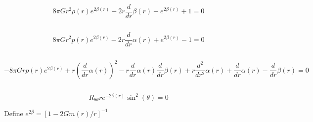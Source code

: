 \documentclass[11pt]{article}
\begin{document}
    \begin{Verbatim}[commandchars=\\\{\}]

    \end{Verbatim}

    $$8 \pi G r^{2} \rho{\left(r \right)} e^{2 \beta{\left(r \right)}} - 2 r \frac{d}{d r} \beta{\left(r \right)} - e^{2 \beta{\left(r \right)}} + 1=0$$

    
    \begin{Verbatim}[commandchars=\\\{\}]

    \end{Verbatim}

    $$8 \pi G r^{2} p{\left(r \right)} e^{2 \beta{\left(r \right)}} - 2 r \frac{d}{d r} \alpha{\left(r \right)} + e^{2 \beta{\left(r \right)}} - 1=0$$

    
    \begin{Verbatim}[commandchars=\\\{\}]

    \end{Verbatim}

    $$- 8 \pi G r p{\left(r \right)} e^{2 \beta{\left(r \right)}} + r \left(\frac{d}{d r} \alpha{\left(r \right)}\right)^{2} - r \frac{d}{d r} \alpha{\left(r \right)} \frac{d}{d r} \beta{\left(r \right)} + r \frac{d^{2}}{d r^{2}} \alpha{\left(r \right)} + \frac{d}{d r} \alpha{\left(r \right)} - \frac{d}{d r} \beta{\left(r \right)}=0$$

    
    \begin{Verbatim}[commandchars=\\\{\}]

    \end{Verbatim}

    $$R_{\theta \theta} r e^{- 2 \beta{\left(r \right)}} \sin^{2}{\left(\theta \right)}=0$$

    
    Define \(e^{2 \beta} = [1 - 2 G m(r) / r ]^{-1}\)
\end{document}
